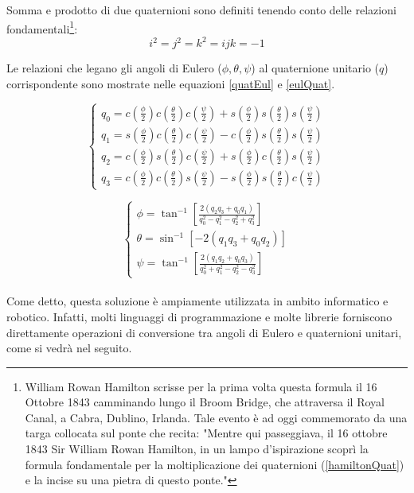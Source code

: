 Somma e prodotto di due quaternioni sono definiti tenendo conto delle relazioni fondamentali\footnote{William Rowan Hamilton scrisse per la prima volta questa formula il 16 Ottobre 1843 camminando lungo il Broom Bridge, che attraversa il Royal Canal, a Cabra, Dublino, Irlanda. Tale evento è ad oggi commemorato da una targa collocata sul ponte che recita: "Mentre qui passeggiava, il 16 ottobre 1843 Sir William Rowan Hamilton, in un lampo d'ispirazione scoprì la formula fondamentale per la moltiplicazione dei quaternioni (\ref{hamiltonQuat}) e la incise su una pietra di questo ponte."}:
\begin{equation}
	 i^2 = j^2 = k^2 = ijk = -1
	 \label{hamiltonQuat}
\end{equation}

Le relazioni che legano gli angoli di Eulero ($\phi, \theta, \psi$) al quaternione unitario ($q$) corrispondente sono mostrate nelle equazioni \ref{quatEul} e \ref{eulQuat}.

\begin{equation}
	\begin{cases}
		q_0 = c(\frac{\phi}{2})c(\frac{\theta}{2})c(\frac{\psi}{2}) + s(\frac{\phi}{2})s(\frac{\theta}{2})s(\frac{\psi}{2}) \\
		q_1 = s(\frac{\phi}{2})c(\frac{\theta}{2})c(\frac{\psi}{2}) - c(\frac{\phi}{2})s(\frac{\theta}{2})s(\frac{\psi}{2}) \\
		q_2 = c(\frac{\phi}{2})s(\frac{\theta}{2})c(\frac{\psi}{2}) + s(\frac{\phi}{2})c(\frac{\theta}{2})s(\frac{\psi}{2}) \\
		q_3 = c(\frac{\phi}{2})c(\frac{\theta}{2})s(\frac{\psi}{2}) - s(\frac{\phi}{2})s(\frac{\theta}{2})c(\frac{\psi}{2})
	\end{cases}
	\label{quatEul}
\end{equation}

\begin{equation}
	\begin{cases}
		\phi = \tan^{-1} \left[\frac{2(q_2q_3 + q_0q_1)}{q_0^2 - q_1^2 - q_2^2 + q_3^2}\right] \\
		\theta = \sin^{-1} \left[-2(q_1q_3 + q_0q_2)\right] \\
		\psi = \tan^{-1} \left[\frac{2(q_1q_2 + q_0q_3)}{q_0^2 + q_1^2 - q_2^2 - q_3^2}\right]
	\end{cases}
	\label{eulQuat}
\end{equation}\\

Come detto, questa soluzione è ampiamente utilizzata in ambito informatico e robotico. Infatti, molti linguaggi di programmazione e molte librerie forniscono direttamente operazioni di conversione tra angoli di Eulero e quaternioni unitari, come si vedrà nel seguito.

